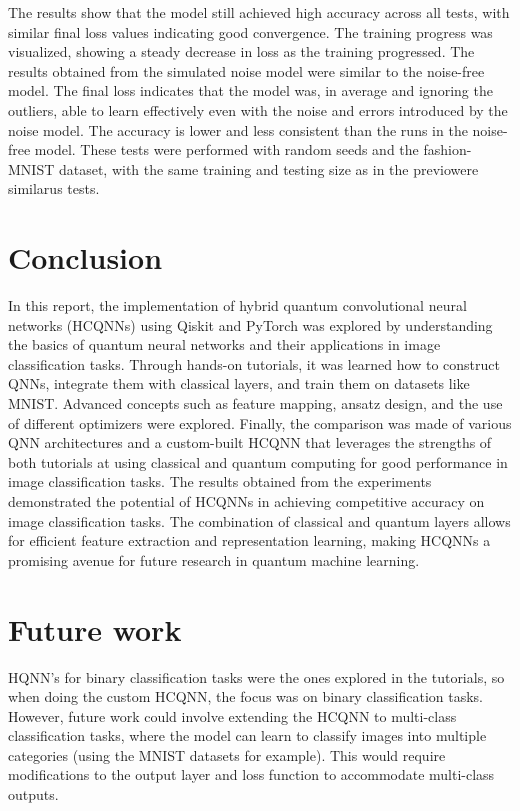 \documentclass[conference]{IEEEtran}
\begin{document}
\noindent
The results show that the model still achieved high accuracy across all tests, with similar final loss values indicating good convergence. The training progress was visualized, showing a steady decrease in loss as the training progressed. The results obtained from the simulated noise model were similar to the noise-free model. The final loss indicates that the model was, in average and ignoring the outliers, able to learn effectively even with the noise and errors introduced by the noise model. The accuracy is lower and less consistent than the runs in the noise-free model. These tests were performed with random seeds and the fashion-MNIST dataset, with the same training and testing size as in the previowere similarus tests.

\section*{\fontsize{16}{20}\selectfont Conclusion}
\noindent
In this report, the implementation of hybrid quantum convolutional neural networks (HCQNNs) using Qiskit and PyTorch  was explored by understanding the basics of quantum neural networks and their applications in image classification tasks. Through hands-on tutorials, it was learned how to construct QNNs, integrate them with classical layers, and train them on datasets like MNIST. Advanced concepts such as feature mapping, ansatz design, and the use of different optimizers were explored. Finally, the comparison was made of various QNN architectures and a custom-built HCQNN that leverages the strengths of both tutorials at using classical and quantum computing for good performance in image classification tasks.
The results obtained from the experiments demonstrated the potential of HCQNNs in achieving competitive accuracy on image classification tasks. The combination of classical and quantum layers allows for efficient feature extraction and representation learning, making HCQNNs a promising avenue for future research in quantum machine learning. 


\section*{\fontsize{16}{20}\selectfont Future work}

\noindent
HQNN's for binary classification tasks were the ones explored in the tutorials, so when doing the custom HCQNN, the focus was on binary classification tasks. However, future work could involve extending the HCQNN to multi-class classification tasks, where the model can learn to classify images into multiple categories (using the MNIST datasets for example). This would require modifications to the output layer and loss function to accommodate multi-class outputs.\\
\end{document}
